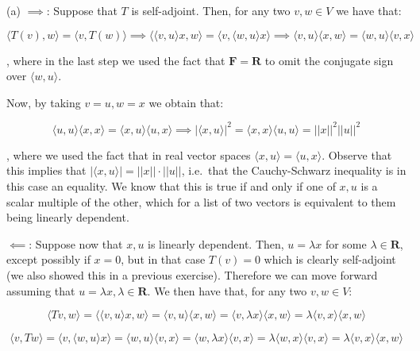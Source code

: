 \begin{solution}

    (a) $\implies$: Suppose that $T$ is self-adjoint. Then, for any two $v, w \in V$ we have that:
    
    $$\langle T(v), w \rangle = \langle v, T(w) \rangle \implies \langle \langle v, u \rangle x, w \rangle = \langle v, \langle w, u \rangle x \rangle \implies \langle v, u \rangle \langle x, w \rangle = \langle w, u \rangle \langle v, x \rangle$$

    , where in the last step we used the fact that $\mathbf{F} = \mathbf{R}$ to omit the conjugate sign over $\langle w, u \rangle$.

    Now, by taking $v = u, w = x$ we obtain that:

    $$ \langle u, u \rangle \langle x, x \rangle = \langle x, u \rangle \langle u, x \rangle \implies \lvert \langle x, u \rangle \rvert^2 = \langle x, x \rangle \langle u, u \rangle = \lvert \lvert x \rvert \rvert^2 \lvert \lvert u \rvert \rvert ^2$$

    , where we used the fact that in real vector spaces $\langle x, u \rangle = \langle u, x \rangle$. Observe that this implies that $\lvert \langle x, u \rangle \rvert = \lvert \lvert x \rvert \rvert \cdot \lvert \lvert u \rvert \rvert$, i.e.\ that the Cauchy-Schwarz inequality is in this case an equality. We know that this is true if and only if one of $x, u$ is a scalar multiple of the other, which for a list of two vectors is equivalent to them being linearly dependent.

    $\impliedby$: Suppose now that $x, u$ is linearly dependent. Then, $u = \lambda x$ for some $\lambda \in \mathbf{R}$, except possibly if $x = 0$, but in that case $T(v) = 0$ which is clearly self-adjoint (we also showed this in a previous exercise). Therefore we can move forward assuming that $u = \lambda x, \lambda \in \mathbf{R}$. We then have that, for any two $v, w \in V$:

    $$\langle Tv, w \rangle = \langle \langle v, u \rangle x, w \rangle = \langle v, u \rangle \langle x, w \rangle = \langle v, \lambda x \rangle \langle x, w \rangle = \lambda \langle v, x \rangle \langle x, w \rangle$$

    $$\langle v, Tw \rangle = \langle v, \langle w, u \rangle x \rangle = \langle w, u \rangle \langle v, x \rangle = \langle w, \lambda x \rangle \langle v, x \rangle = \lambda \langle w, x \rangle \langle v, x \rangle = \lambda \langle v, x \rangle \langle x, w \rangle$$


\end{solution}
